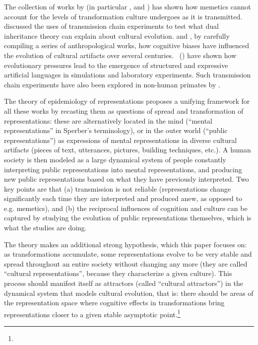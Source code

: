 \begin{new}
The collection of works by \citet{aunger_darwinizing_2000} (in particular \citealp{bloch_well-disposed_2000}, and \citealp{kuper_if_2000}) has shown how  memetics cannot account for the levels of transformation culture undergoes as it is transmitted.
  discussed the uses of transmission chain experiments to test what dual inheritance theory can explain about cultural evolution.
 and \citet{miton_universal_2015}, by carefully compiling a series of anthropological works,  how cognitive biases have influenced the evolution of cultural artifacts over several centuries.
\citeauthor{kirby_cumulative_2008}~(\citeyear{kirby_cumulative_2008,cornish_systems_2013}) have shown how evolutionary pressures lead to the emergence of structured and expressive artificial languages in simulations and laboratory experiments.
Such transmission chain experiments have also been explored in non-human primates by \citet{claidiere_cultural_2014}.

The theory of epidemiology of representations proposes a unifying framework for all these works by recasting them as questions of spread and transformation of representations:
these are alternatively located in the mind (``mental representations'' in Sperber's terminology), or in the outer world (``public representations'') as expressions of mental representations in diverse cultural artifacts (pieces of text, utterances, pictures, building techniques, etc.).
A human society is then modeled as a large dynamical system of people constantly interpreting public representations into mental representations, and producing new public representations based on what they have previously interpreted.
Two key points are that (a) transmission is not reliable (representations change significantly each time they are interpreted and produced anew, as opposed to \hbox{e.g.} memetics), and (b) the reciprocal influences of cognition and culture can be captured by studying the evolution of public representations themselves, which is what the  studies are doing.

The theory makes an additional strong hypothesis, which this paper focuses on:
as transformations accumulate, some representations evolve to be very stable and spread throughout an entire society without changing any more (they are called ``cultural representations'', because they characterize a given culture).
This process should manifest itself as attractors (called ``cultural attractors'') in the dynamical system that models cultural evolution, that is:
there should be areas of the representation space where cognitive effects in transformations bring representations closer to a given stable asymptotic point.\footnote{
}


\end{new}

